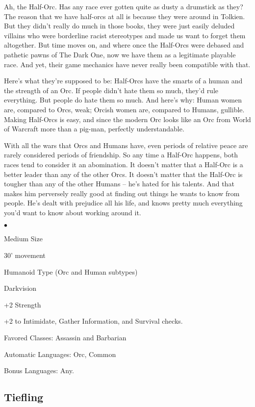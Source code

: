 Ah, the Half-Orc. Has any race ever gotten quite as dusty a drumstick as they? The reason that we have half-orcs at all is because they were around in Tolkien. But they didn't really do much in those books, they were just easily deluded villains who were borderline racist stereotypes and made us want to forget them altogether. But time moves on, and where once the Half-Orcs were debased and pathetic pawns of The Dark One, now we have them as a legitimate playable race. And yet, their game mechanics have never really been compatible with that.

Here's what they're supposed to be: Half-Orcs have the smarts of a human and the strength of an Orc. If people didn't hate them so much, they'd rule everything. But people do hate them so much. And here's why: Human women are, compared to Orcs, weak; Orcish women are, compared to Humans, gullible. Making Half-Orcs is easy, and since the modern Orc looks like an Orc from World of Warcraft more than a pig-man, perfectly understandable.

With all the wars that Orcs and Humans have, even periods of relative peace are rarely considered periods of friendship. So any time a Half-Orc happens, both races tend to consider it an abomination. It doesn't matter that a Half-Orc is a better leader than any of the other Orcs. It doesn't matter that the Half-Orc is tougher than any of the other Humans -- he's hated for his talents. And that makes him perversely really good at finding out things he wants to know from people. He's dealt with prejudice all his life, and knows pretty much everything you'd want to know about working around it.

\begin{list}{$\bullet$}{\itemspace}
    \item Medium Size
    \item 30' movement
    \item Humanoid Type (Orc and Human subtypes)
    \item Darkvision
    \item +2 Strength
    \item +2 to Intimidate, Gather Information, and Survival checks.
    \item Favored Classes: Assassin and Barbarian
    \item Automatic Languages: Orc, Common
    \item Bonus Languages: Any.
\end{list}

\subsection{Tiefling}

